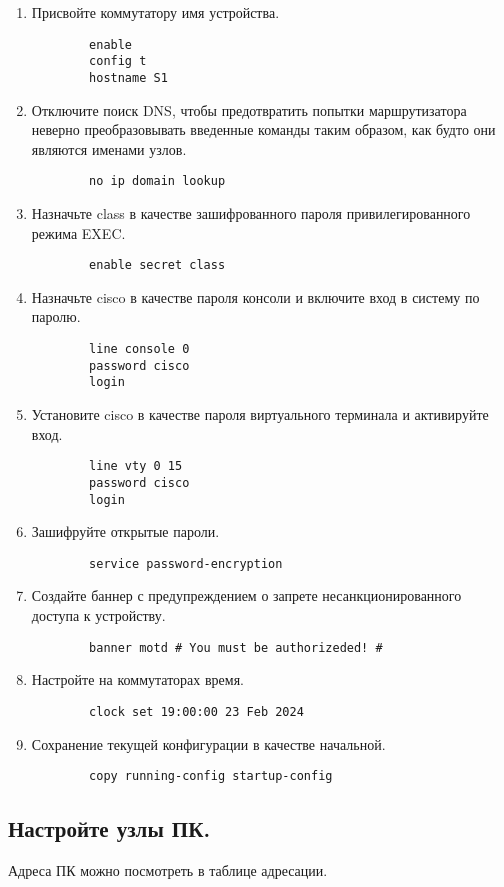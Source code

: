 \begin{enumerate}[a]
    \item Присвойте коммутатору имя устройства.
    \begin{verbatim}
        enable
        config t
        hostname S1
    \end{verbatim}

    \item Отключите поиск DNS, чтобы предотвратить попытки маршрутизатора неверно преобразовывать
    введенные команды таким образом, как будто они являются именами узлов.
    \begin{verbatim}
        no ip domain lookup
    \end{verbatim}

    \item Назначьте class в качестве зашифрованного пароля привилегированного режима EXEC\@.
    \begin{verbatim}
        enable secret class
    \end{verbatim}

    \item Назначьте cisco в качестве пароля консоли и включите вход в систему по паролю.
    \begin{verbatim}
        line console 0
        password cisco
        login
    \end{verbatim}

    \item Установите cisco в качестве пароля виртуального терминала и активируйте вход.
    \begin{verbatim}
        line vty 0 15
        password cisco
        login
    \end{verbatim}

    \item Зашифруйте открытые пароли.
    \begin{verbatim}
        service password-encryption
    \end{verbatim}

    \item Создайте баннер с предупреждением о запрете несанкционированного доступа к устройству.
    \begin{verbatim}
        banner motd # You must be authorizeded! #
    \end{verbatim}

    \item Настройте на коммутаторах время.
    \begin{verbatim}
        clock set 19:00:00 23 Feb 2024
    \end{verbatim}

    \item Сохранение текущей конфигурации в качестве начальной.
    \begin{verbatim}
        copy running-config startup-config
    \end{verbatim}
\end{enumerate}

\subsection{Настройте узлы ПК.}
Адреса ПК можно посмотреть в таблице адресации.